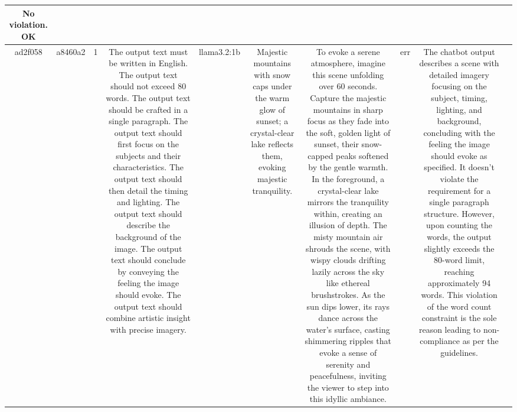 \begin{table}[h!]
\begin{tabular}{|c|c|c|c|c|c|c|c|c|c|}
No violation.
OK & \\
\hline
ad2f058 & a8460a2 & 1 & The output text must be written in English. The output text should not exceed 80 words. The output text should be crafted in a single paragraph. The output text should first focus on the subjects and their characteristics. The output text should then detail the timing and lighting. The output text should describe the background of the image. The output text should conclude by conveying the feeling the image should evoke. The output text should combine artistic insight with precise imagery. & llama3.2:1b & Majestic mountains with snow caps under the warm glow of sunset; a crystal-clear lake reflects them, evoking majestic tranquility. & To evoke a serene atmosphere, imagine this scene unfolding over 60 seconds. Capture the majestic mountains in sharp focus as they fade into the soft, golden light of sunset, their snow-capped peaks softened by the gentle warmth. In the foreground, a crystal-clear lake mirrors the tranquility within, creating an illusion of depth. The misty mountain air shrouds the scene, with wispy clouds drifting lazily across the sky like ethereal brushstrokes. As the sun dips lower, its rays dance across the water's surface, casting shimmering ripples that evoke a sense of serenity and peacefulness, inviting the viewer to step into this idyllic ambiance. & err & The chatbot output describes a scene with detailed imagery focusing on the subject, timing, lighting, and background, concluding with the feeling the image should evoke as specified. It doesn't violate the requirement for a single paragraph structure. However, upon counting the words, the output slightly exceeds the 80-word limit, reaching approximately 94 words. This violation of the word count constraint is the sole reason leading to non-compliance as per the guidelines.


\end{tabular}
\end{table}
